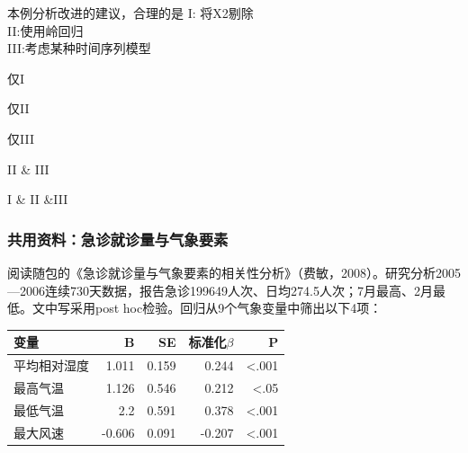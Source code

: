 \par\addvspace{6pt}\noindent\begin{minipage}{\linewidth}


本例分析改进的建议，合理的是 I: 将X2剔除\\
II:使用岭回归\\
III:考虑某种时间序列模型


\begin{choices}

\item 仅I

\item 仅II

\item 仅III

\item II \& III

\item I \& II \&III

\end{choices}

\end{minipage}\par\vspace{4pt}

\subsubsection*{共用资料：急诊就诊量与气象要素}

阅读随包的《急诊就诊量与气象要素的相关性分析》（费敏，2008）。研究分析2005---2006连续730天数据，报告急诊199649人次、日均274.5人次；7月最高、2月最低。文中写采用post hoc检验。回归从9个气象变量中筛出以下4项：

\begin{center}\small\setlength{\tabcolsep}{3.5pt}\renewcommand{\arraystretch}{1.18}\begin{tabular}{@{}lrrrr@{}}
\toprule
变量 & B & SE & 标准化\(\beta\) & P \\
\midrule

平均相对湿度 & 1.011 & 0.159 & 0.244 & \textless.001 \\
最高气温 & 1.126 & 0.546 & 0.212 & \textless.05 \\
最低气温 & 2.2 & 0.591 & 0.378 & \textless.001 \\
最大风速 & -0.606 & 0.091 & -0.207 & \textless.001 \\
\bottomrule\end{tabular}\end{center}

